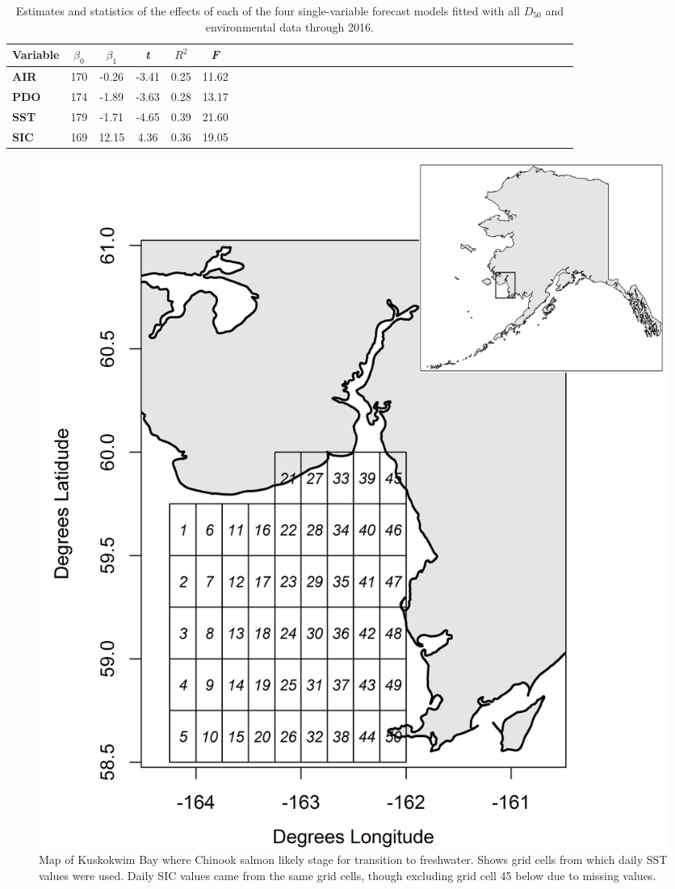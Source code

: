 \documentclass[12pt,]{book}
\theoremstyle{definition}
\theoremstyle{definition}
\theoremstyle{definition}
\theoremstyle{remark}
\begin{document}
\pagebreak

\begin{table}

\caption{\label{tab:coefs-table}Estimates and statistics of the effects of each of the four single-variable forecast models fitted with all  $D_{50}$ and environmental data through 2016.}
\centering
\begin{tabular}[t]{>{\bfseries}lccccclccccclccccclccccclccccclccccc}
\toprule
Variable & $\beta_0$ & $\beta_1$ & \textit{t} & $R^2$ & \textit{F}\\
\midrule
AIR & 170 & -0.26 & -3.41 & 0.25 & 11.62\\
PDO & 174 & -1.89 & -3.63 & 0.28 & 13.17\\
SST & 179 & -1.71 & -4.65 & 0.39 & 21.60\\
SIC & 169 & 12.15 & 4.36 & 0.36 & 19.05\\
\bottomrule
\end{tabular}
\end{table}

\pagebreak

\begin{figure}
  \centering
  \includegraphics{img/Ch2/map.png}
  \caption{Map of Kuskokwim Bay where Chinook salmon likely stage for transition to freshwater. Shows grid cells from which daily SST values were used. Daily SIC values came from the same grid cells, though excluding grid cell 45 below due to missing values.}
  \label{fig:ch2-map}
\end{figure}
\end{document}
